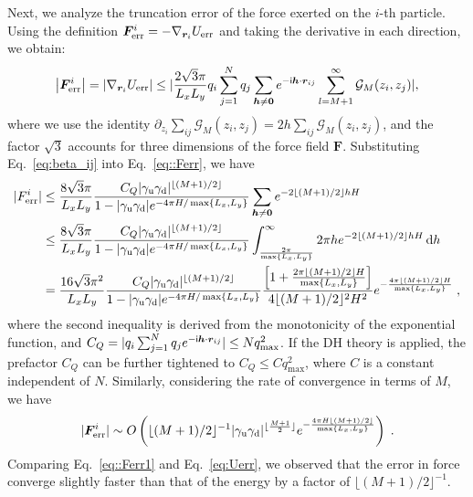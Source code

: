 Next, we analyze the truncation error of the force exerted on the $i$-th particle. Using the definition $\bm{F}^i_{\text{err}}=-\nabla_{\bm{r}_i} U_{\text{err}}$ and taking the derivative in each direction, we obtain:
\begin{equation}\label{eq::Ferr}
    \left|\bm{F}^i_{\text{err}}\right| = \left|\nabla_{\bm{r}_i} U_{\text{err}}\right|\leq  \lvert\frac{2\sqrt{3}\pi}{L_xL_y} q_i \sum_{j=1}^{N} q_j\sum_{\bm{h}\neq \bm{0}} e^{-\mathsf i \bm{h}\cdot\bm{r}_{ij}}\sum\limits_{l = M + 1}^{\infty}\mathcal{G}_{M}(z_i,z_j)\rvert, 
\end{equation}
where we use the identity $\partial_{z_i}\sum_{ij}\mathcal{G}_M(z_{i},z_{j})=2h\sum_{ij}\mathcal{G}_{M}(z_i,z_j)$, and the factor $\sqrt{3}$ accounts for three dimensions of the force field $\bm F$.  
Substituting Eq.~\eqref{eq:beta_ij} into Eq.~\eqref{eq::Ferr}, we have 
\begin{equation}
\begin{split}
 |F^{i}_{\text{err}}| %
 & \leq \frac{8\sqrt{3}\pi}{L_xL_y}  \frac{C_{Q} \abs{\gamma_{\T u} \gamma_{\T d}}^{\lfloor{(M+1)/2}\rfloor}}{1 - \abs{\gamma_{\T u} \gamma_{\T d}} e^{- 4\pi H / \max\{L_x,L_y\}}} \sum_{\bm{h}\neq \bm{0}} e^{- 2 \lfloor{(M+1)/2}\rfloor hH}\\
 & \leq \frac{8\sqrt{3}\pi}{L_xL_y} \frac{ C_Q\abs{\gamma_{\T u} \gamma_{\T d}}^{\lfloor{(M+1)/2}\rfloor}}{1 - \abs{\gamma_{\T u} \gamma_{\T d}} e^{- 4\pi H / \max\{L_x,L_y\}}} \int_{\frac{2\pi}{\max\{L_x,L_y\}}}^{\infty} 2\pi h e^{- 2 \lfloor{(M+1)/2}\rfloor hH} \, \mathrm{d}h \\
& = \frac{16\sqrt{3} \pi^2}{L_xL_y} \frac{C_Q \abs{\gamma_{\T u} \gamma_{\T d}}^{\lfloor{(M+1)/2}\rfloor}}{1 - \abs{\gamma_{\T u} \gamma_{\T d}} e^{- 4\pi H / \max\{L_x,L_y\}}}  \frac{\left[1 + \frac{2\pi \lfloor{(M+1)/2}\rfloor H}{\max\{L_x,L_y\}}\right]}{4 \lfloor{(M+1)/2}\rfloor^2 H^2} e^{- \frac{4\pi \lfloor{(M+1)/2}\rfloor H}{\max\{L_x,L_y\}}}\;,
\end{split}
\end{equation}
where the second inequality is derived from the monotonicity of the exponential function, and $C_Q=|q_{i}\sum_{j=1}^{N}q_je^{-\mathsf i\bm{h}\cdot \bm{r}_{ij}}|\leq Nq_{\text{max}}^2$. 
If the DH theory is applied, the prefactor $C_Q$ can be further tightened to $C_Q\leq Cq_{\max}^2$, where $C$ is a constant independent of $N$. 
Similarly, considering the rate of convergence in terms of $M$, we have
\begin{equation}\label{eq::Ferr1}
|\bm{F}^i_{\text{err}}| \sim O\left(\lfloor (M+1)/2\rfloor^{-1}\lvert\gamma_{\text{u}} \gamma_{\text{d}}\rvert^{\lfloor\frac{M+1}{2}\rfloor} e^{-\frac{4\pi H \lfloor(M+1)/2\rfloor}{\max\{L_x,L_y\}}}\right)\;.
\end{equation}
Comparing Eq.~\eqref{eq::Ferr1} and Eq.~\eqref{eq:Uerr},
we observed that the error in force converge slightly faster than that of the energy by a factor of $\lfloor (M+1)/2\rfloor^{-1}$. 

